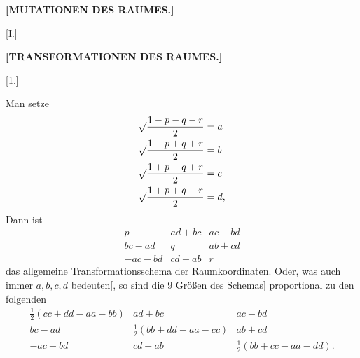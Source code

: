 \begin{center}\bfseries [MUTATIONEN DES RAUMES.]\end{center}
\begin{center}[I.]\end{center}
\begin{center}\bfseries [TRANSFORMATIONEN DES RAUMES.]\end{center}
\begin{center}[1.]\end{center}

Man setze
\[
\begin{aligned}
\mathord{\surd}\frac{1-p-q-r}{2}&=a\\
\mathord{\surd}\frac{1-p+q+r}{2}&=b\\
\mathord{\surd}\frac{1+p-q+r}{2}&=c\\
\mathord{\surd}\frac{1+p+q-r}{2}&=d,
\end{aligned}
\]
Dann ist
\[
\begin{array}{ccc}
p&ad+bc&ac-bd\\
bc-ad&q&ab+cd\\
-ac-bd&cd-ab&r
\end{array}
\]
das allgemeine Transformationsschema der Raumkoordinaten. Oder, was auch immer $a,b,c,d$ bedeuten[, so sind die 9 Größen des Schemas] proportional zu den folgenden
\[
\begin{array}{ccc}
\tfrac12(cc+dd-aa-bb)&ad+bc&ac-bd\\
bc-ad&\tfrac12(bb+dd-aa-cc)&ab+cd\\
-ac-bd&cd-ab&\tfrac12(bb+cc-aa-dd).
\end{array}
\]
